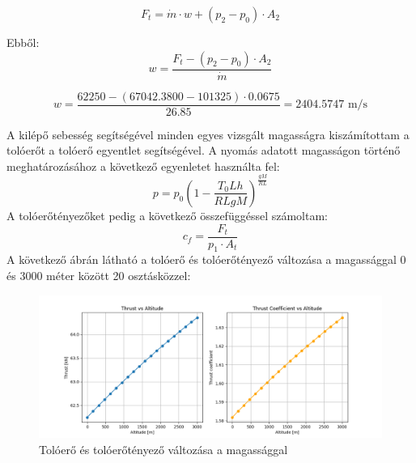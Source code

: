 \documentclass[a4paper,12pt]{article}
\begin{document}
\[
F_t = \dot{m} \cdot w + (p_2 - p_0) \cdot A_2
\]

Ebből:
\[
w  = \frac{F_t - (p_2 - p_0) \cdot A_2}{\dot{m}}
\]

\[ w = \frac{62250 - (67042.3800 - 101325) \cdot 0.0675}{26.85} = 2404.5747 \text{ m/s} \]

A kilépő sebesség segítségével minden egyes vizsgált magasságra kiszámítottam a tolóerőt a tolóerő egyentlet segítségével.
A nyomás adatott magasságon történő meghatározásához a következő egyenletet használta fel:
\[ p = p_0 \left(1 - \frac{T_0 L h}{R L g M}\right)^{\frac{g M}{R L}} \]
A tolóerőtényezőket pedig a következő összefüggéssel számoltam:
\[
c_f = \frac{F_t}{p_1 \cdot A_t}
\]
A következő ábrán látható a tolóerő és tolóerőtényező változása a magassággal 0 és 3000 méter között 20 osztásközzel:
\begin{figure}[H]
    \centering
    \includegraphics[width=1\textwidth]{images/plots.png}
    \caption{Tolóerő és tolóerőtényező változása a magassággal}
    \label{fig:rocket_force}
\end{figure}
\end{document}
